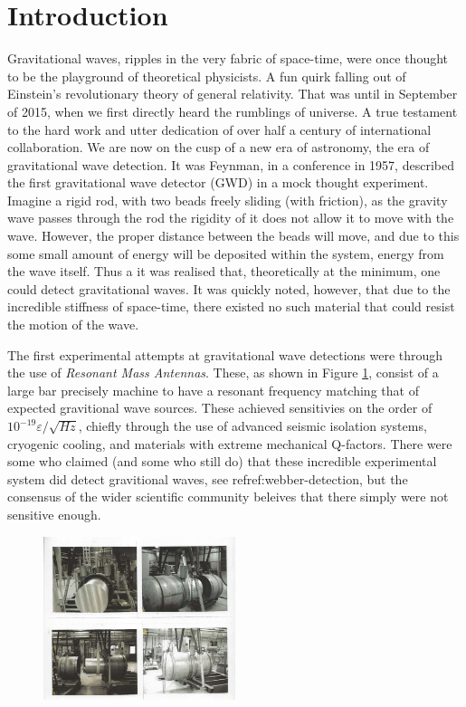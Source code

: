 \documentclass[aps,
                pra,  
                a4paper, 
                amsmath, 
                amssymb, 
                preprint,
                amsfonts,
                nofootinbib,
                titlepage
            ]{revtex4-2}
\begin{document}
\section{Introduction}
    \par
    Gravitational waves, ripples in the very fabric of space-time, were once thought to be the playground of theoretical physicists. A fun quirk falling out of Einstein's revolutionary theory of general relativity. That was until in September of 2015, when we first directly heard the rumblings of universe. A true testament to the hard work and utter dedication of over half a century of international collaboration. We are now on the cusp of a new era of astronomy, the era of gravitational wave detection. It was Feynman, in a conference in 1957, described the first gravitational wave detector (GWD) in a mock thought experiment. Imagine a rigid rod, with two beads freely sliding (with friction), as the gravity wave passes through the rod the rigidity of it does not allow it to move with the wave. However, the proper distance between the beads will move, and due to this some small amount of energy will be deposited within the system, energy from the wave itself. Thus a it was realised that, theoretically at the minimum, one could detect gravitational waves. It was quickly noted, however, that due to the incredible stiffness of space-time, there existed no such material that could resist the motion of the wave.
    \par
    The first experimental attempts at gravitational wave detections were through the use of \textit{Resonant Mass Antennas}. These, as shown in Figure \ref{pic:resonant_bar}, consist of a large bar precisely machine to have a resonant frequency matching that of expected gravitional wave sources. These achieved sensitivies on the order of $10^{-19}\varepsilon/\sqrt{Hz}$, chiefly through the use of advanced seismic isolation systems, cryogenic cooling, and materials with extreme mechanical Q-factors. There were some who claimed (and some who still do) that these incredible experimental system did detect gravitional waves, see ref{ref:webber-detection}, but the consensus of the wider scientific community beleives that there simply were not sensitive enough.
    \begin{figure}
        \centering
        \includegraphics[width=0.5\textwidth]{img/weber-bar.jpg}
        \label{pic:resonant_bar}
    \end{figure}
\end{document}
